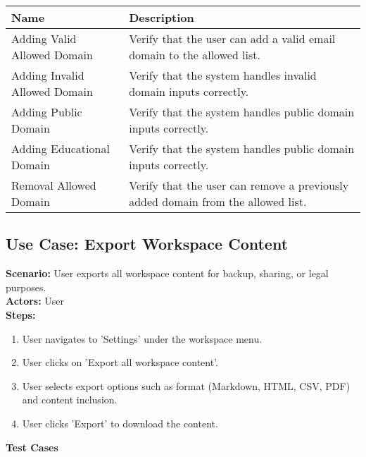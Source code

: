 \documentclass{article}
\begin{document}
            \begin{longtable}{|p{}|p{}|}
            \hline
            \textbf{Name} & \textbf{Description} \\
            \hline
            Adding Valid Allowed Domain & Verify that the user can add a valid email domain to the allowed list. \\
\hline
Adding Invalid Allowed Domain & Verify that the system handles invalid domain inputs correctly. \\
\hline
Adding Public Domain & Verify that the system handles public domain inputs correctly. \\
\hline
Adding Educational Domain & Verify that the system handles public domain inputs correctly. \\
\hline
Removal Allowed Domain & Verify that the user can remove a previously added domain from the allowed list. \\
\hline
\end{longtable}\subsection{\textbf{Use Case: Export Workspace Content}}
\textbf{Scenario:} User exports all workspace content for backup, sharing, or legal purposes.\\
\textbf{Actors:} User\\
\textbf{Steps:}
\begin{enumerate}
\item User navigates to 'Settings' under the workspace menu.
\item User clicks on 'Export all workspace content'.
\item User selects export options such as format (Markdown, HTML, CSV, PDF) and content inclusion.
\item User clicks 'Export' to download the content.
\end{enumerate}
\textbf{Test Cases}
\end{document}

